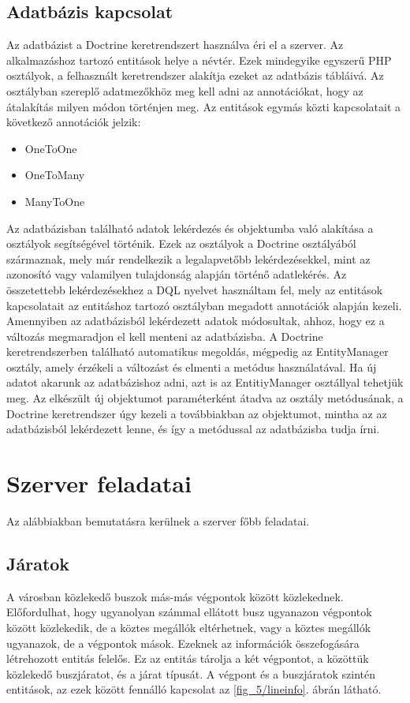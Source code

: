 \subsection*{Adatbázis kapcsolat}
\label{adatbazis}
Az adatbázist a Doctrine keretrendszert használva éri el a szerver. 
Az alkalmazáshoz tartozó entitások helye a  névtér. 
Ezek mindegyike egyszerű PHP osztályok, a felhasznált keretrendszer alakítja ezeket az adatbázis tábláivá. 
Az osztályban szereplő adatmezőkhöz meg kell adni az annotációkat, hogy az átalakítás milyen módon történjen meg. 
Az entitások egymás közti kapcsolatait a következő annotációk jelzik:
\begin{itemize}
	\item OneToOne
	\item OneToMany
	\item ManyToOne
\end{itemize}
Az adatbázisban található adatok lekérdezés és objektumba való alakítása a  osztályok segítségével történik. 
Ezek az osztályok a Doctrine  osztályából származnak, mely már rendelkezik a legalapvetőbb lekérdezésekkel, mint az azonosító vagy valamilyen tulajdonság alapján történő adatlekérés. 
Az összetettebb lekérdezésekhez a DQL nyelvet használtam fel, mely az entitások kapcsolatait az entitáshoz tartozó osztályban megadott annotációk alapján kezeli. 
Amennyiben az adatbázisból lekérdezett adatok módosultak, ahhoz, hogy ez a változás megmaradjon el kell menteni az adatbázisba. 
A Doctrine keretrendszerben található automatikus megoldás, mégpedig az EntityManager osztály, amely érzékeli a változást és elmenti a  metódus használatával. 
Ha új adatot akarunk az adatbázishoz adni, azt is az EntitiyManager osztállyal tehetjük meg. 
Az elkészült új objektumot paraméterként átadva az osztály  metódusának, a Doctrine keretrendszer úgy kezeli a továbbiakban az objektumot, mintha az az adatbázisból lekérdezett lenne, és így a  metódussal az adatbázisba tudja írni. 
\section{Szerver feladatai}
\label{serverjob}
Az alábbiakban bemutatásra kerülnek a szerver főbb feladatai.
\subsection*{Járatok}
\label{lineinfodetails}
A városban közlekedő buszok más-más végpontok között közlekednek. 
Előfordulhat, hogy ugyanolyan számmal ellátott busz ugyanazon végpontok között közlekedik, de a köztes megállók eltérhetnek, vagy a köztes megállók ugyanazok, de a végpontok mások. 
Ezeknek az információk összefogására létrehozott  entitás felelős. 
Ez az entitás tárolja a két végpontot, a közöttük közlekedő buszjáratot, és a járat típusát. 
A végpont és a buszjáratok szintén entitások, az ezek között fennálló kapcsolat az \ref{fig_5/lineinfo}. ábrán látható. 
